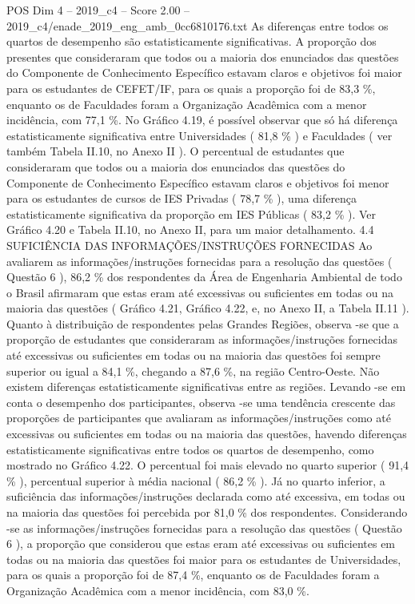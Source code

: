 \begin{textsample}{POS Dim 4 – 2019\_c4 – Score 2.00 – 2019\_c4/enade\_2019\_eng\_amb\_0cc6810176.txt}
As diferenças entre todos os quartos de desempenho são estatisticamente significativas.
A proporção dos presentes que consideraram que todos ou a maioria dos enunciados das questões do Componente de Conhecimento Específico estavam claros e objetivos foi maior para os estudantes de CEFET/IF, para os quais a proporção foi de 83,3 \%, enquanto os de Faculdades foram a Organização Acadêmica com a menor incidência, com 77,1 \%.
No Gráfico 4.19, é possível observar que só há diferença estatisticamente significativa entre Universidades ( 81,8 \% ) e Faculdades ( ver também Tabela II.10, no Anexo II ).
O percentual de estudantes que consideraram que todos ou a maioria dos enunciados das questões do Componente de Conhecimento Específico estavam claros e objetivos foi menor para os estudantes de cursos de IES Privadas ( 78,7 \% ), uma diferença estatisticamente significativa da proporção em IES Públicas ( 83,2 \% ).
Ver Gráfico 4.20 e Tabela II.10, no Anexo II, para um maior detalhamento. 4.4 SUFICIÊNCIA DAS INFORMAÇÕES/INSTRUÇÕES FORNECIDAS Ao avaliarem as informações/instruções fornecidas para a resolução das questões ( Questão 6 ), 86,2 \% dos respondentes da Área de Engenharia Ambiental de todo o Brasil afirmaram que estas eram até excessivas ou suficientes em todas ou na maioria das questões ( Gráfico 4.21, Gráfico 4.22, e, no Anexo II, a Tabela II.11 ).
Quanto à distribuição de respondentes pelas Grandes Regiões, observa -se que a proporção de estudantes que consideraram as informações/instruções fornecidas até excessivas ou suficientes em todas ou na maioria das questões foi sempre superior ou igual a 84,1 \%, chegando a 87,6 \%, na região Centro-Oeste.
Não existem diferenças estatisticamente significativas entre as regiões.
Levando -se em conta o desempenho dos participantes, observa -se uma tendência crescente das proporções de participantes que avaliaram as informações/instruções como até excessivas ou suficientes em todas ou na maioria das questões, havendo diferenças estatisticamente significativas entre todos os quartos de desempenho, como mostrado no Gráfico 4.22.
O percentual foi mais elevado no quarto superior ( 91,4 \% ), percentual superior à média nacional ( 86,2 \% ).
Já no quarto inferior, a suficiência das informações/instruções declarada como até excessiva, em todas ou na maioria das questões foi percebida por 81,0 \% dos respondentes.
Considerando -se as informações/instruções fornecidas para a resolução das questões ( Questão 6 ), a proporção que considerou que estas eram até excessivas ou suficientes em todas ou na maioria das questões foi maior para os estudantes de Universidades, para os quais a proporção foi de 87,4 \%, enquanto os de Faculdades foram a Organização Acadêmica com a menor incidência, com 83,0 \%.

\end{textsample}
